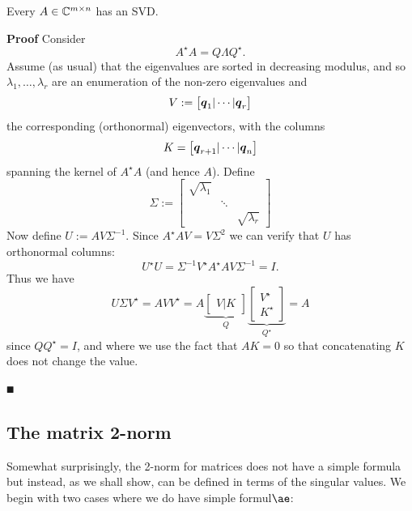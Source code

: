 \begin{theorem} Every $A \in {\mathbb C}^{m \times n}$ has an SVD.

\end{theorem}
\textbf{Proof} Consider
\[
A^\ensuremath{\star} A = Q \ensuremath{\Lambda} Q^\ensuremath{\star}.
\]
Assume (as usual) that the eigenvalues are sorted in decreasing modulus, and so $\ensuremath{\lambda}_1,\ensuremath{\ldots},\ensuremath{\lambda}_r$ are an enumeration of the non-zero eigenvalues and
\[
V := \begin{bmatrix} \bm{{\mbox{\boldmath$q$\unboldmath}}}_1 | \cdots | \bm{{\mbox{\boldmath$q$\unboldmath}}}_r \end{bmatrix}
\]
the corresponding (orthonormal) eigenvectors, with the columns
\[
K = \begin{bmatrix} \bm{{\mbox{\boldmath$q$\unboldmath}}}_{r+1} | \cdots | \bm{{\mbox{\boldmath$q$\unboldmath}}}_n \end{bmatrix}
\]
spanning the kernel of $A^\ensuremath{\star} A$ (and hence $A$).  Define
\[
\ensuremath{\Sigma} :=  \begin{bmatrix} \sqrt{\ensuremath{\lambda}_1} \\ & \ensuremath{\ddots} \\ && \sqrt{\ensuremath{\lambda}_r} \end{bmatrix}
\]
Now define $U := AV \ensuremath{\Sigma}^{-1}$. Since $A^\ensuremath{\star} A V = V \ensuremath{\Sigma}^2$ we can verify that $U$ has orthonormal columns:
\[
U^\ensuremath{\star} U = \ensuremath{\Sigma}^{-1} V^\ensuremath{\star} A^\ensuremath{\star} A V \ensuremath{\Sigma}^{-1} = I.
\]
Thus we have
\[
U \ensuremath{\Sigma} V^\ensuremath{\star} = A V V^\ensuremath{\star} = A \underbrace{\begin{bmatrix} V | K \end{bmatrix}}_Q\underbrace{\begin{bmatrix} V^\ensuremath{\star} \\ K^\ensuremath{\star} \end{bmatrix}}_{Q^\ensuremath{\star}} = A
\]
since $Q Q^\ensuremath{\star} = I$, and where we use the fact that $A K = 0$ so that concatenating $K$ does not change the value.

\ensuremath{\QED}

\subsection{The matrix 2-norm}
Somewhat surprisingly, the 2-norm for matrices does not have a simple formula but instead, as we shall show, can be defined in terms of the singular values. We begin with two cases where we do have simple formul\ensuremath{\ae}:

